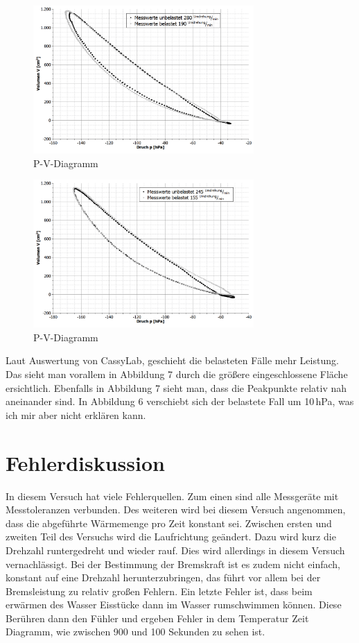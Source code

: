 \documentclass[fontsize=12pt]{scrartcl}
\begin{document}
\begin{figure}[H]
\centering
\includegraphics[width=0.75\textwidth]{Graphik/bla1}
\caption{P-V-Diagramm}
\end{figure}
\begin{figure}[H]
\centering
\includegraphics[width=0.75\textwidth]{Graphik/bla2}
\caption{P-V-Diagramm}
\end{figure}
Laut Auswertung von CassyLab, geschieht die belasteten Fälle mehr Leistung. Das sieht man vorallem in Abbildung 7 durch die größere eingeschlossene Fläche ersichtlich. Ebenfalls in Abbildung 7 sieht man, dass die Peakpunkte relativ nah aneinander sind. In Abbildung 6 verschiebt sich der belastete Fall um 10\,hPa, was ich mir aber nicht erklären kann. 

\section{Fehlerdiskussion}

In diesem Versuch hat viele Fehlerquellen. Zum einen sind alle Messgeräte mit Messtoleranzen verbunden. Des weiteren wird bei diesem Versuch angenommen, dass die abgeführte Wärmemenge pro Zeit konstant sei. Zwischen ersten und zweiten Teil des Versuchs wird die Laufrichtung geändert. Dazu wird kurz die Drehzahl runtergedreht und wieder rauf. Dies wird allerdings in diesem Versuch vernachlässigt.  Bei der Bestimmung der Bremskraft ist es zudem nicht einfach, konstant auf eine Drehzahl herunterzubringen, das führt vor allem bei der Bremsleistung zu relativ großen Fehlern. Ein letzte Fehler ist, dass beim erwärmen des Wasser Eisstücke dann im Wasser rumschwimmen können. Diese Berühren dann den Fühler und ergeben Fehler in dem Temperatur Zeit Diagramm, wie zwischen 900 und 100 Sekunden zu sehen ist.
\end{document}
